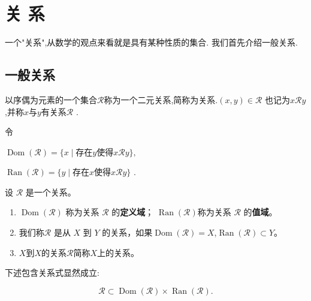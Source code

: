 
\section{关 系}

一个"关系",从数学的观点来看就是具有某种性质的集合. 我们首先介绍一般关系.

\subsection{一般关系}
	\label{sec:1-2-1}



\begin{mydef*}{}

以序偶为元素的一个集合\(\mathscr{R}\)称为一个二元关系,简称为关系.\((x,y)\in\mathscr{R}\) 也记为\(x\mathscr{R}y\) ,并称$x$与$y$有关系\(\mathscr{R}\) .

\end{mydef*}


令

\(\operatorname{Dom}(\mathscr{R}) = \{x \mid \text{存在}y\text{使得}x\mathscr{R}y\},\)

\(\operatorname{Ran}(\mathscr{R}) = \{y \mid \text{存在}x\text{使得}x\mathscr{R}y\}\) .

\begin{mydef*}
	
	设 \(\mathscr R\) 是一个关系。
	
	\begin{enumerate}[label=\arabic*)]
		\item $\operatorname{Dom}(\mathscr R)$ 称为关系 \(\mathscr R\) 的\textbf{定义域}； $\operatorname{Ran}(\mathscr R)$称为关系 \(\mathscr R\) 的\textbf{值域}。
		
		\item
		我们称\(\mathscr R\) 是从 \(X\) 到 \(Y\) 的关系，如果$\operatorname{Dom}(\mathscr R)=X$,$\operatorname{Ran}(\mathscr R)\subset Y$。
		
		\item $X$到$X$的关系\(\mathscr R\)简称$X$上的关系。
		
	\end{enumerate}
	
\end{mydef*}

下述包含关系式显然成立:

\[\mathscr{R} \subset \operatorname{Dom}\left( \mathscr{R} \right) \times \operatorname{Ran}\left( \mathscr{R} \right).\]

